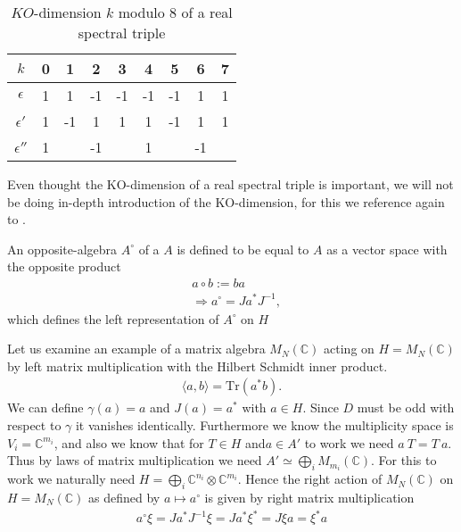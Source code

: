 \begin{table}[h!]
    \centering
    \caption{$KO$-dimension $k$ modulo $8$ of a real spectral triple}
    \begin{tabular}{ c | c c c c c c c c}
        \hline
        $k$        & 0 & 1 & 2 & 3 & 4 & 5 & 6 & 7 \\
        \hline
     $\epsilon$    & 1 & 1 & -1 & -1 & -1 & -1 & 1 & 1 \\
     $\epsilon '$  & 1 & -1 & 1 & 1 & 1 & -1 & 1 & 1 \\
     $\epsilon ''$ & 1 &  & -1 &  & 1 &  & -1 &  \\
     \hline
    \end{tabular}
\end{table}
\noindent
Even thought the KO-dimension of a real spectral triple is important, we will
not be doing in-depth introduction of the KO-dimension, for this we reference
again to \cite{ncgwalter}.

\begin{mydefinition}
An opposite-algebra $A^\circ$ of a $A$ is defined to be equal to $A$ as a
vector space with the opposite product
\begin{align}
    &a\circ b := ba\\
    &\Rightarrow a^\circ = Ja^* J^{-1},
\end{align}
which defines the left representation of $A^\circ$ on $H$
\end{mydefinition}


Let us examine an example of a matrix algebra $M_N(\mathbb{C})$ acting on
$H=M_N(\mathbb{C})$ by left matrix multiplication with the Hilbert Schmidt
inner product.
\begin{align}
    \langle a , b \rangle = \text{Tr}(a^* b).
\end{align}
We can define $\gamma (a) = a$ and $J(a) = a^*$ with $a\in H$.  Since $D$
must be odd with respect to $\gamma$ it vanishes identically.  Furthermore we
know the multiplicity space is $V_i = \mathbb{C}^{m_i}$, and also we know
that for $T\in H$ and$a\in A'$ to work we need $a\ T=T\ a$. Thus by laws of
matrix multiplication we need $A' \simeq \bigoplus _i M_{m_i}(\mathbb{C})$. For
this to work we naturally need $H = \bigoplus_i \mathbb{C}^{n_i} \otimes
\mathbb{C}^{m_i}$.  Hence the right action of $M_N(\mathbb{C})$ on $H =
M_N(\mathbb{C})$ as defined by $a \mapsto a^\circ$ is given by right matrix
multiplication
\begin{align}
    a^\circ \xi = J a^* J^{-1}\xi = Ja^* \xi^* = J\xi a=\xi^* a
\end{align}

